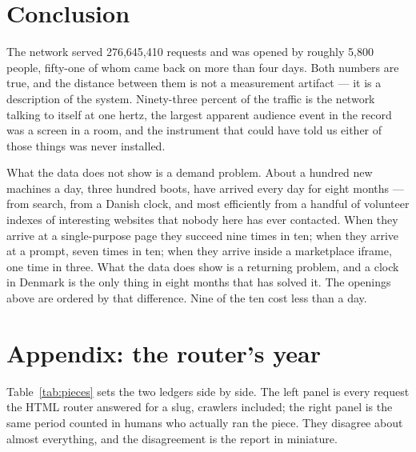 \documentclass[10pt,letterpaper,twocolumn]{article}
\begin{document}
\section{Conclusion}

The network served 276,645,410 requests and was opened by roughly
5,800 people, fifty-one of whom came back on more than four days. Both
numbers are true, and the distance between them is not a measurement
artifact --- it is a description of the system. Ninety-three percent of
the traffic is the network talking to itself at one hertz, the largest
apparent audience event in the record was a screen in a room, and the
instrument that could have told us either of those things was never
installed.

What the data does not show is a demand problem. About a hundred new machines a day, three hundred boots, have arrived
every day for eight months --- from search, from a Danish clock, and most
efficiently from a handful of volunteer indexes of interesting websites
that nobody here has ever contacted.
When they arrive at a single-purpose page they succeed nine times in
ten; when they arrive at a prompt, seven times in ten; when they arrive
inside a marketplace iframe, one time in three. What the data does show
is a returning problem, and a clock in Denmark is the only thing in
eight months that has solved it. The openings above are ordered by that
difference. Nine of the ten cost less than a day.

\section{Appendix: the router's year}
\label{sec:appendix}

Table~\ref{tab:pieces} sets the two ledgers side by side. The left panel
is every request the HTML router answered for a slug, crawlers included;
the right panel is the same period counted in humans who actually ran
the piece. They disagree about almost everything, and the disagreement
is the report in miniature.
\end{document}
